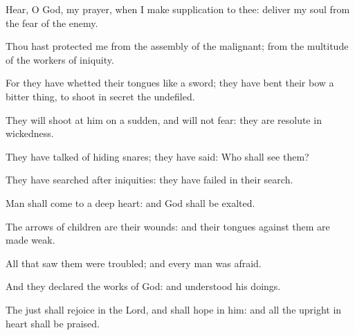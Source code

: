 \item Hear, O God, my prayer, when I make supplication to thee: deliver my soul from the fear of the enemy.
\item Thou hast protected me from the assembly of the malignant; from the multitude of the workers of iniquity.
\item For they have whetted their tongues like a sword; they have bent their bow a bitter thing, to shoot in secret the undefiled.
\item They will shoot at him on a sudden, and will not fear: they are resolute in wickedness.
\item They have talked of hiding snares; they have said: Who shall see them?
\item They have searched after iniquities: they have failed in their search.
\item Man shall come to a deep heart: and God shall be exalted.
\item The arrows of children are their wounds: and their tongues against them are made weak.
\item All that saw them were troubled; and every man was afraid.
\item And they declared the works of God: and understood his doings.
\item The just shall rejoice in the Lord, and shall hope in him: and all the upright in heart shall be praised.
